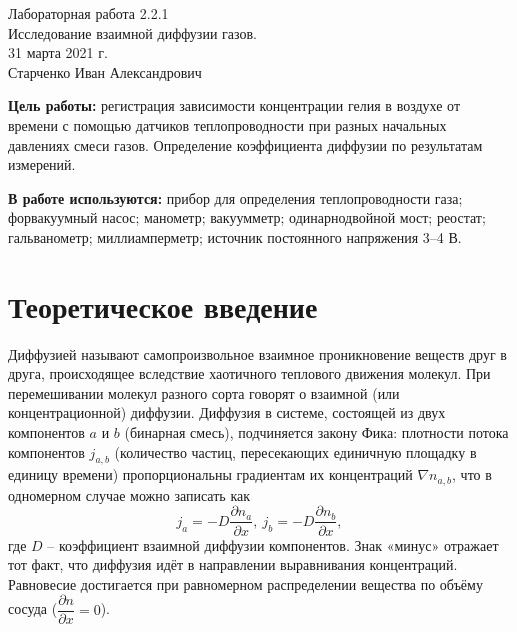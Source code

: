 




\setcounter{page}{1}



\begin{center}
  \LARGE{Лабораторная работа 2.2.1}\\[0.2cm]
  \LARGE{Исследование взаимной диффузии газов.}\\[0.2cm]
  \large{31 марта 2021 г.}\\[0.2cm]
  \large{Старченко Иван Александрович}\\[0.2cm]
\end{center}

\textbf{Цель работы:} регистрация зависимости концентрации гелия в воздухе от времени с помощью датчиков теплопроводности при разных начальных давлениях смеси газов. Определение коэффициента диффузии по результатам измерений.

\textbf{В работе используются:} прибор для определения теплопроводности газа; форвакуумный насос; манометр; вакуумметр; одинарнодвойной мост; реостат; гальванометр; миллиамперметр; источник постоянного напряжения 3–4 В.

\section{Теоретическое введение}

Диффузией называют самопроизвольное взаимное проникновение веществ друг в друга, происходящее вследствие хаотичного теплового движения молекул. При перемешивании молекул разного сорта говорят о взаимной (или концентрационной) диффузии. Диффузия в системе, состоящей из двух компонентов $a$ и $b$ (бинарная смесь), подчиняется закону Фика: плотности потока компонентов $j_{a, b}$ (количество частиц, пересекающих единичную площадку в единицу времени) пропорциональны градиентам их концентраций $\nabla n_{a, b}$, что в одномерном случае можно записать как 
\begin{equation}
	j_a = -D \dfrac{\partial n_a}{\partial x},~j_b = -D \dfrac{\partial n_b}{\partial x},
\end{equation}
где $D$ -- коэффициент взаимной диффузии компонентов. Знак «минус» отражает тот факт, что диффузия идёт в направлении выравнивания концентраций. Равновесие достигается при равномерном распределении вещества по объёму сосуда ($\dfrac{\partial n}{\partial x} = 0$).

